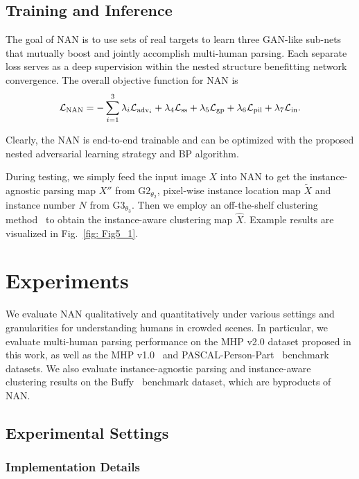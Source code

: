 \documentclass[10pt,twocolumn,letterpaper]{article}
\theoremstyle{definition}
\theoremstyle{remark}
\begin{document}
\subsection{Training and Inference}

The goal of NAN is to use sets of real targets to learn three GAN-like sub-nets that mutually boost and jointly accomplish multi-human parsing. Each separate loss serves as a deep supervision within the nested structure benefitting network convergence. The overall objective function for NAN is
\begin{equation}
\small
\mathcal{L}_{\mathrm{NAN}}=-\sum\limits_{i=1}^{3}\lambda_i \mathcal{L}_{\mathrm{adv}_i}+\lambda_4\mathcal{L}_{\mathrm{ss}}+\lambda_5\mathcal{L}_{\mathrm{gp}}+\lambda_6\mathcal{L}_{\mathrm{pil}}+\lambda_7\mathcal{L}_{\mathrm{in}}.
\end{equation}

Clearly, the NAN is end-to-end trainable and can be optimized with the proposed nested adversarial learning strategy and BP algorithm. 

During testing, we simply feed the input image $X$ into NAN to get the instance-agnostic parsing map $X{''}$ from  $\mathrm{G2}_{\theta_2}$, pixel-wise instance location map $\tilde{X}$ and instance number $N$ from $\mathrm{G3}_{\theta_3}$. Then we employ an off-the-shelf clustering method~\cite{ng2002spectral} to obtain the instance-aware clustering map $\hat{X}$. Example results are visualized in Fig.~\ref{fig: Fig5_1}.

\section{Experiments}

We evaluate NAN qualitatively and quantitatively under various settings and granularities for understanding humans in crowded scenes. In particular,
we evaluate multi-human parsing performance on the MHP v2.0 dataset proposed in this work, as well as the MHP v1.0~\cite{li2017towards} and PASCAL-Person-Part~\cite{chen2014detect} benchmark datasets. We also evaluate instance-agnostic parsing and instance-aware clustering results on the Buffy~\cite{vineet2011human} benchmark dataset, which are byproducts of NAN.

\subsection{Experimental Settings}
\label{sec5.1}

\subsubsection{Implementation Details}
\end{document}
